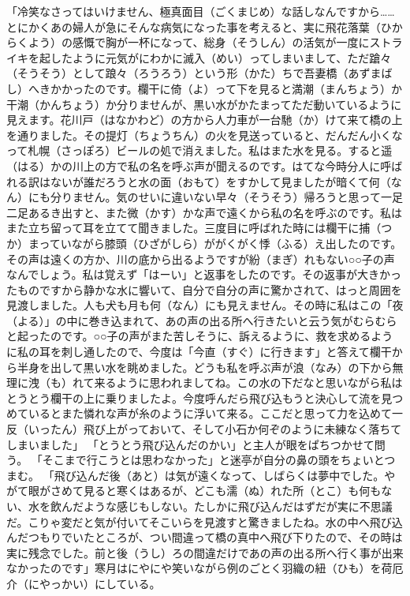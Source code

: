 \documentclass{book}
\begin{document}
「冷笑なさってはいけません、極真面目（ごくまじめ）な話しなんですから\ldots{}\ldots{}とにかくあの婦人が急にそんな病気になった事を考えると、実に飛花落葉（ひからくよう）の感慨で胸が一杯になって、総身（そうしん）の活気が一度にストライキを起したように元気がにわかに滅入（めい）ってしまいまして、ただ蹌々（そうそう）として踉々（ろうろう）という形（かた）ちで吾妻橋（あずまばし）へきかかったのです。欄干に倚（よ）って下を見ると満潮（まんちょう）か干潮（かんちょう）か分りませんが、黒い水がかたまってただ動いているように見えます。花川戸（はなかわど）の方から人力車が一台馳（か）けて来て橋の上を通りました。その提灯（ちょうちん）の火を見送っていると、だんだん小くなって札幌（さっぽろ）ビールの処で消えました。私はまた水を見る。すると遥（はる）かの川上の方で私の名を呼ぶ声が聞えるのです。はてな今時分人に呼ばれる訳はないが誰だろうと水の面（おもて）をすかして見ましたが暗くて何（なん）にも分りません。気のせいに違いない早々（そうそう）帰ろうと思って一足二足あるき出すと、また微（かす）かな声で遠くから私の名を呼ぶのです。私はまた立ち留って耳を立てて聞きました。三度目に呼ばれた時には欄干に捕（つか）まっていながら膝頭（ひざがしら）ががくがく悸（ふる）え出したのです。その声は遠くの方か、川の底から出るようですが紛（まぎ）れもない○○子の声なんでしょう。私は覚えず「はーい」と返事をしたのです。その返事が大きかったものですから静かな水に響いて、自分で自分の声に驚かされて、はっと周囲を見渡しました。人も犬も月も何（なん）にも見えません。その時に私はこの「夜（よる）」の中に巻き込まれて、あの声の出る所へ行きたいと云う気がむらむらと起ったのです。○○子の声がまた苦しそうに、訴えるように、救を求めるように私の耳を刺し通したので、今度は「今直（すぐ）に行きます」と答えて欄干から半身を出して黒い水を眺めました。どうも私を呼ぶ声が浪（なみ）の下から無理に洩（も）れて来るように思われましてね。この水の下だなと思いながら私はとうとう欄干の上に乗りましたよ。今度呼んだら飛び込もうと決心して流を見つめているとまた憐れな声が糸のように浮いて来る。ここだと思って力を込めて一反（いったん）飛び上がっておいて、そして小石か何ぞのように未練なく落ちてしまいました」
「とうとう飛び込んだのかい」と主人が眼をぱちつかせて問う。
「そこまで行こうとは思わなかった」と迷亭が自分の鼻の頭をちょいとつまむ。
「飛び込んだ後（あと）は気が遠くなって、しばらくは夢中でした。やがて眼がさめて見ると寒くはあるが、どこも濡（ぬ）れた所（とこ）も何もない、水を飲んだような感じもしない。たしかに飛び込んだはずだが実に不思議だ。こりゃ変だと気が付いてそこいらを見渡すと驚きましたね。水の中へ飛び込んだつもりでいたところが、つい間違って橋の真中へ飛び下りたので、その時は実に残念でした。前と後（うし）ろの間違だけであの声の出る所へ行く事が出来なかったのです」寒月はにやにや笑いながら例のごとく羽織の紐（ひも）を荷厄介（にやっかい）にしている。
\end{document}
